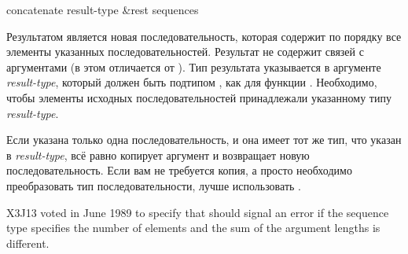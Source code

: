 \begin{defun}[Функция]
concatenate result-type &rest sequences

Результатом является новая последовательность, которая содержит по порядку все
элементы указанных последовательностей. Результат не содержит связей с
аргументами (в этом  отличается от ). Тип
результата указывается в аргументе \emph{result-type}, который должен быть
подтипом , как для функции .
Необходимо, чтобы элементы исходных последовательностей принадлежали указанному
типу \emph{result-type}.

Если указана только одна последовательность, и она имеет тот же тип, что
указан в \emph{result-type},  всё равно копирует аргумент и
возвращает новую последовательность. Если вам не требуется копия, а просто
необходимо преобразовать тип последовательности, лучше использовать
.

\begin{newer}
X3J13 voted in June 1989  to specify that
 should signal an error if the sequence type specifies the
number of elements and the sum of the argument lengths is different.
\end{newer}
\end{defun}

